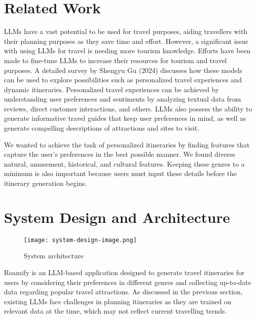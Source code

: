 \documentclass[manuscript,review,anonymous]{acmart}
\begin{document}
\section{Related Work}
    LLMs have a vast potential to be used for travel purposes, aiding travellers with their planning purposes as they save time and effort. However, a significant issue with using LLMs for travel is needing more tourism knowledge\cite{ref1}. Efforts have been made to fine-tune LLMs to increase their resources for tourism and travel purposes\cite{ref3}. A detailed survey by Shengyu Gu (2024) discusses how these models can be used to explore possibilities such as personalized travel experiences and dynamic itineraries\cite{ref4}. Personalized travel experiences can be achieved by understanding user preferences and sentiments by analyzing textual data from reviews, direct customer interactions, and others. LLMs also possess the ability to generate informative travel guides that keep user preferences in mind, as well as generate compelling descriptions of attractions and sites to visit.
    
    We wanted to achieve the task of personalized itineraries by finding features that capture the user's preferences in the best possible manner. We found diverse natural, amusement, historical, and cultural features. Keeping these genres to a minimum is also important because users must input these details before the itinerary generation begins.

\vspace{-7pt}

\section{System Design and Architecture}
    
    \begin{figure}[h!]
        \centering
        \texttt{[image: system-design-image.png]}
        \caption{System architecture}
        \label{fig:system-design}
    \end{figure}
    
    Roamify is an LLM-based application designed to generate travel itineraries for users by considering their preferences in different genres and collecting up-to-date data regarding popular travel attractions. As discussed in the previous section, existing LLMs face challenges in planning itineraries as they are trained on relevant data at the time, which may not reflect current travelling trends.
    
\end{document}

